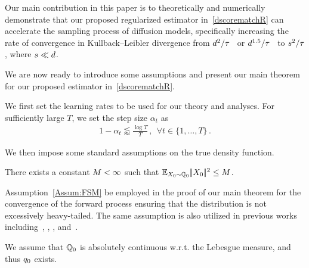 Our main contribution in this paper is to theoretically and numerically demonstrate that our proposed regularized estimator in~\eqref{dscorematchR} can accelerate the sampling process of diffusion models, specifically increasing the rate of convergence in  Kullback–Leibler divergence from $\textcolor{black}{d}^2/\textcolor{black}{\tau}$~\citep{li2023towards} or $\textcolor{black}{d}^{1.5}/\textcolor{black}{\tau}$~\citep{liang2024nonN} to $s^2/\textcolor{black}{\tau}$, where $s \ll \textcolor{black}{d}$.


We are now ready to introduce some assumptions and present our main theorem for our proposed estimator in~\eqref{dscorematchR}.


We first set the learning rates to be used for our theory and analyses.
For sufficiently large $T$, we set the step size $\alpha_t$ as
\begin{align}\label{eq:stepsize}
    1-\alpha_t\lessapprox \frac{\log T}{T}\,,~~\forall t\in \{1,\dots,T\}\,.
\end{align}

We then impose some standard assumptions on the true density function.
    
\begin{assumption}\label{Assum:FSM}
There exists a constant $M<\infty$ 
such that $\textcolor{black}{\mathbb{E}}_{X_0\sim \mathbb{Q}_0}|\!|X_0|\!|^2\le M$.    
\end{assumption}
Assumption~\ref{Assum:FSM} be employed in the proof of our main theorem for the convergence of the forward process ensuring that the distribution is not excessively heavy-tailed.
The same assumption is also utilized in previous works including~\citet{chen2023improved}, \citet{chen2022sampling}, \citet{benton2023linear}, and~\citet{liang2024nonN}.

\begin{assumption}\label{assum:conAna}
    We assume that $\mathbb{Q}_0$ is absolutely continuous w.r.t. the Lebesgue measure, and thus $q_0$
exists. 
\end{assumption}

